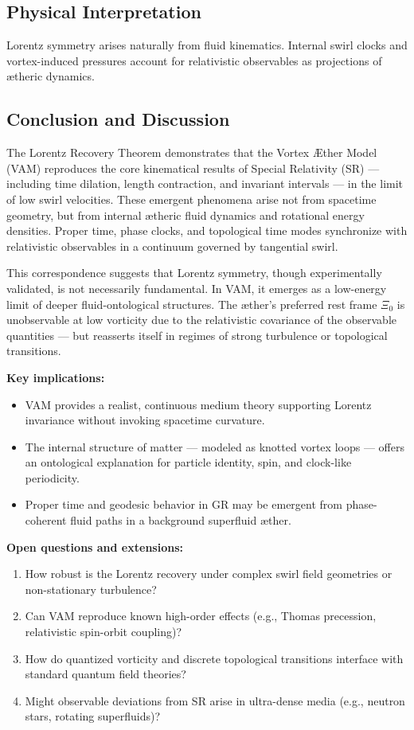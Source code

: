 \documentclass[preprint]{revtex4-2}
\begin{document}
    \subsection*{Physical Interpretation}
    Lorentz symmetry arises naturally from fluid kinematics. Internal swirl clocks and vortex-induced pressures account for relativistic observables as projections of ætheric dynamics.

    \subsection{Conclusion and Discussion}

    The Lorentz Recovery Theorem demonstrates that the Vortex Æther Model (VAM) reproduces the core kinematical results of Special Relativity (SR) — including time dilation, length contraction, and invariant intervals — in the limit of low swirl velocities. These emergent phenomena arise not from spacetime geometry, but from internal ætheric fluid dynamics and rotational energy densities. Proper time, phase clocks, and topological time modes synchronize with relativistic observables in a continuum governed by tangential swirl.

    This correspondence suggests that Lorentz symmetry, though experimentally validated, is not necessarily fundamental. In VAM, it emerges as a low-energy limit of deeper fluid-ontological structures. The æther's preferred rest frame \( \Xi_0 \) is unobservable at low vorticity due to the relativistic covariance of the observable quantities — but reasserts itself in regimes of strong turbulence or topological transitions.

    \textbf{Key implications:}
    \begin{itemize}
        \item VAM provides a realist, continuous medium theory supporting Lorentz invariance without invoking spacetime curvature.
        \item The internal structure of matter — modeled as knotted vortex loops — offers an ontological explanation for particle identity, spin, and clock-like periodicity.
        \item Proper time and geodesic behavior in GR may be emergent from phase-coherent fluid paths in a background superfluid æther.
    \end{itemize}

    \textbf{Open questions and extensions:}
    \begin{enumerate}
        \item How robust is the Lorentz recovery under complex swirl field geometries or non-stationary turbulence?
        \item Can VAM reproduce known high-order effects (e.g., Thomas precession, relativistic spin-orbit coupling)?
        \item How do quantized vorticity and discrete topological transitions interface with standard quantum field theories?
        \item Might observable deviations from SR arise in ultra-dense media (e.g., neutron stars, rotating superfluids)?
    \end{enumerate}
\end{document}
